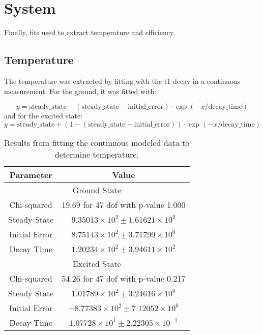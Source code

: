 \section{System}
Finally, fits used to extract temperature and efficiency.
\subsection{Temperature}
The temperature was extracted by fitting with the t1 decay in a continuous measurement. For the ground, it was fitted with:
\begin{fullwidth}
\begin{equation}
    y = \text{steady\_state} - (\text{steady\_state} - \text{initial\_error}) \cdot \exp(-x / \text{decay\_time})
\end{equation}
and for the excited state:
\begin{equation}
    y = \text{steady\_state} + (1-  (\text{steady\_state} - \text{initial\_error})) \cdot \exp(-x / \text{decay\_time})
\end{equation}
\end{fullwidth}

\begin{table}[h]
\centering
\begin{tabular}{|c|c|}
\hline
Parameter & Value \\
\hline
\multicolumn{2}{|c|}{Ground State} \\
\hline
Chi-squared & 19.69 for 47 dof with p-value 1.000 \\
Steady State & $9.35013 \times 10^2 \pm 1.61621 \times 10^2$ \\
Initial Error & $8.75143 \times 10^2 \pm 3.71799 \times 10^0$ \\
Decay Time & $1.20234 \times 10^2 \pm 3.94611 \times 10^2$ \\
\hline
\multicolumn{2}{|c|}{Excited State} \\
\hline
Chi-squared & 54.26 for 47 dof with p-value 0.217 \\
Steady State & $1.01789 \times 10^2 \pm 3.24616 \times 10^0$ \\
Initial Error & $-8.77383 \times 10^2 \pm 7.12052 \times 10^0$ \\
Decay Time & $1.07728 \times 10^1 \pm 2.22305 \times 10^{-1}$ \\
\hline
\end{tabular}
\caption{Results from fitting the continuous modeled data to determine temperature.}
\label{tab:combined_fit_outcomes}
\end{table}


